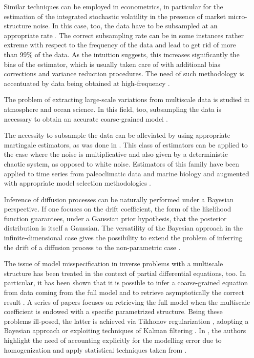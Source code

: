 \documentclass[review,onefignum,onetabnum]{siamonline190516}
\begin{document}
Similar techniques can be employed in econometrics, in particular for the estimation of the integrated stochastic volatility in the presence of market micro-structure noise. In this case, too, the data have to be subsampled at an appropriate rate \cite{AMZ05,OSP10}. The correct subsampling rate can be in some instances rather extreme with respect to the frequency of the data and lead to get rid of more than $99\%$ of the data. As the intuition suggests, this increases significantly the bias of the estimator, which is usually taken care of with additional bias corrections and variance reduction procedures. The need of such methodology is accentuated by data being obtained at high-frequency \cite{AiJ14,ZMA05}.  

The problem of extracting large-scale variations from multiscale data is studied in atmosphere and ocean science. In this field, too, subsampling the data is necessary to obtain an accurate coarse-grained model \cite{CoP09,YMV19}.

The necessity to subsample the data can be alleviated by using appropriate martingale estimators, as was done in \cite{KPK13,KKP15}. This class of estimators can be applied to the case where the noise is multiplicative and also given by a deterministic chaotic system, as opposed to white noise. Estimators of this family have been applied to time series from paleoclimatic data and marine biology and augmented with appropriate model selection methodologies \cite{KPP15}. 

Inference of diffusion processes can be naturally performed under a Bayesian perspective. If one focuses on the drift coefficient, the form of the likelihood function guarantees, under a Gaussian prior hypothesis, that the posterior distribution is itself a Gaussian. The versatility of the Bayesian approach in the infinite-dimensional case \cite{Stu10, DaS16} gives the possibility to extend the problem of inferring the drift of a diffusion process to the non-parametric case \cite{PSV09, PSZ13}. 

The issue of model misspecification in inverse problems with a multiscale structure has been treated in the context of partial differential equations, too. In particular, it has been shown that it is possible to infer a coarse-grained equation from data coming from the full model and to retrieve asymptotically the correct result \cite{NPS12}. A series of papers \cite{AbD20, AbD19, AGZ19} focuses on retrieving the full model when the multiscale coefficient is endowed with a specific parametrized structure. Being these problems ill-posed, the latter is achieved via Tikhonov regularization \cite{AbD19,NPS12}, adopting a Bayesian approach \cite{AbD20, NPS12} or exploiting techniques of Kalman filtering \cite{AGZ19}. In \cite{AbD20,AGZ19}, the authors highlight the need of accounting explicitly for the modelling error due to homogenization and apply statistical techniques taken from \cite{CDS18,CES14}.
\end{document}
